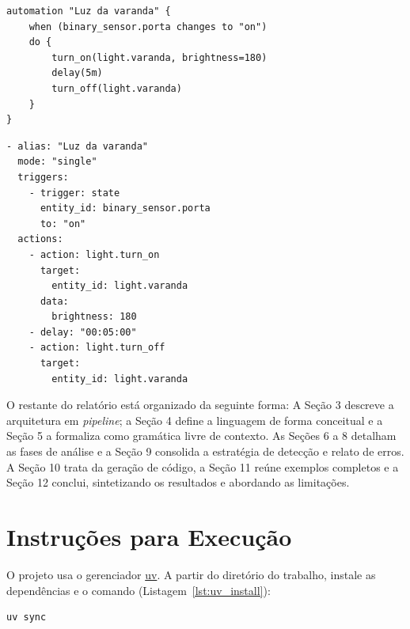 \documentclass[12pt]{article}
\renewcommand\texttt[1]{\svtt{\small#1}}
\begin{document}
\begin{listing}[H]
    \centering
    \begin{verbatim}
automation "Luz da varanda" {
    when (binary_sensor.porta changes to "on")
    do {
        turn_on(light.varanda, brightness=180)
        delay(5m)
        turn_off(light.varanda)
    }
}
    \end{verbatim}
    
    \caption{Uma automação básica em \texttt{jass}.}
    \label{lst:jass_example1}
\end{listing}

\begin{listing}[H]
    \centering
    \begin{verbatim}
- alias: "Luz da varanda"
  mode: "single"
  triggers:
    - trigger: state
      entity_id: binary_sensor.porta
      to: "on"
  actions:
    - action: light.turn_on
      target:
        entity_id: light.varanda
      data:
        brightness: 180
    - delay: "00:05:00"
    - action: light.turn_off
      target:
        entity_id: light.varanda
    \end{verbatim}
    
    \caption{A saída YAML da automação anterior.}
    \label{lst:jass_example1_yaml}
\end{listing}

O restante do relatório está organizado da seguinte forma: A Seção
3 descreve a arquitetura em \emph{pipeline}; a Seção 4 define a
linguagem de forma conceitual e a Seção 5 a formaliza como gramática
livre de contexto. As Seções 6 a 8 detalham as fases de análise e a Seção 9 consolida a estratégia de detecção e
relato de erros. A Seção 10 trata da geração de código, a Seção 11 reúne
exemplos completos e a Seção 12 conclui, sintetizando os resultados e abordando as limitações.

\section{Instruções para Execução}

O projeto usa o gerenciador \href{https://docs.astral.sh/uv/}{uv}. A partir do diretório do
trabalho, instale as dependências e o comando \texttt{jass} (Listagem~\ref{lst:uv_install}):

\begin{listing}[H]
    \centering
    \begin{verbatim}
uv sync
\end{verbatim}
    \caption{Comando para configurar o projeto.}
    \label{lst:uv_install}
\end{listing}
\end{document}
